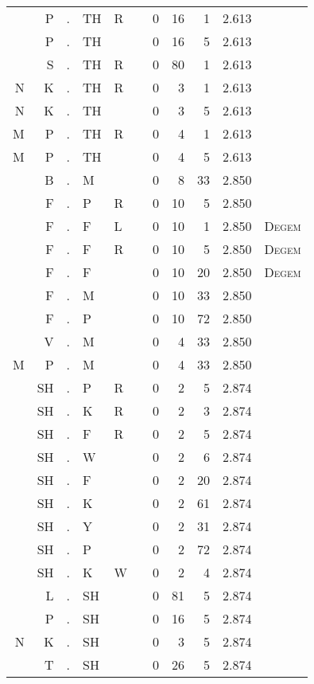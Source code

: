 \begin{longtable}{r@{ } r@{ } c@{ } l@{ } l@{ } l@{ } r r r r l }
  & P & . & TH & R &   & 0 & 16 & 1 & 2.613 &  \\
  & P & . & TH &   &   & 0 & 16 & 5 & 2.613 &  \\
  & S & . & TH & R &   & 0 & 80 & 1 & 2.613 &  \\
N & K & . & TH & R &   & 0 & 3 & 1 & 2.613 &  \\
N & K & . & TH &   &   & 0 & 3 & 5 & 2.613 &  \\
M & P & . & TH & R &   & 0 & 4 & 1 & 2.613 &  \\
M & P & . & TH &   &   & 0 & 4 & 5 & 2.613 &  \\
  & B & . & M &   &   & 0 & 8 & 33 & 2.850 &  \\
  & F & . & P & R &   & 0 & 10 & 5 & 2.850 &  \\
  & F & . & F & L &   & 0 & 10 & 1 & 2.850 & \textsc{Degem} \\
  & F & . & F & R &   & 0 & 10 & 5 & 2.850 & \textsc{Degem} \\
  & F & . & F &   &   & 0 & 10 & 20 & 2.850 & \textsc{Degem} \\
  & F & . & M &   &   & 0 & 10 & 33 & 2.850 &  \\
  & F & . & P &   &   & 0 & 10 & 72 & 2.850 &  \\
  & V & . & M &   &   & 0 & 4 & 33 & 2.850 &  \\
M & P & . & M &   &   & 0 & 4 & 33 & 2.850 &  \\
  & SH & . & P & R &   & 0 & 2 & 5 & 2.874 &  \\
  & SH & . & K & R &   & 0 & 2 & 3 & 2.874 &  \\
  & SH & . & F & R &   & 0 & 2 & 5 & 2.874 &  \\
  & SH & . & W &   &   & 0 & 2 & 6 & 2.874 &  \\
  & SH & . & F &   &   & 0 & 2 & 20 & 2.874 &  \\
  & SH & . & K &   &   & 0 & 2 & 61 & 2.874 &  \\
  & SH & . & Y &   &   & 0 & 2 & 31 & 2.874 &  \\
  & SH & . & P &   &   & 0 & 2 & 72 & 2.874 &  \\
  & SH & . & K & W &   & 0 & 2 & 4 & 2.874 &  \\
  & L & . & SH &   &   & 0 & 81 & 5 & 2.874 &  \\
  & P & . & SH &   &   & 0 & 16 & 5 & 2.874 &  \\
N & K & . & SH &   &   & 0 & 3 & 5 & 2.874 &  \\
  & T & . & SH &   &   & 0 & 26 & 5 & 2.874 &  \\

\end{longtable}
